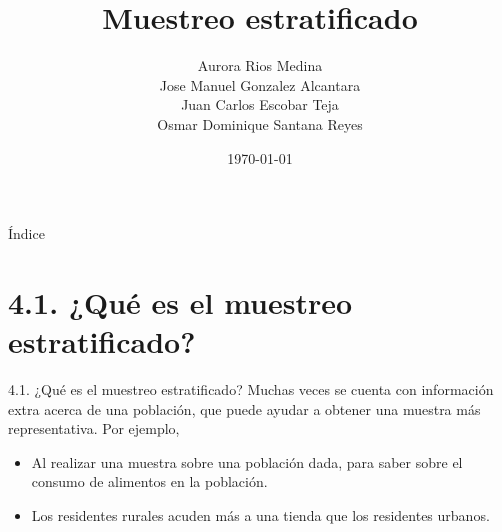 \documentclass[12pt,compress,usenames,dvipsnames,aspectratio=169]{beamer}
\title{\textbf{Muestreo estratificado}}
\author{Aurora Rios Medina \\
Jose Manuel Gonzalez Alcantara \\
Juan Carlos Escobar Teja \\
Osmar Dominique Santana Reyes}
\date{\today}
\begin{document}
\frame{\titlepage}


\begin{frame}{Índice}
	\tableofcontents
\end{frame}


\section{4.1. ¿Qué es el muestreo estratificado?}
\begin{frame}{4.1. ¿Qué es el muestreo estratificado?}
    Muchas veces se cuenta con información extra acerca de una población, que puede ayudar a obtener una muestra más representativa. Por ejemplo, \vspace{0.5mm}

    \begin{minipage}[h]{0.4\linewidth}
        \begin{itemize}
            \item Al realizar una muestra sobre una población dada, para saber sobre el consumo de alimentos en la población. 
            
        \end{itemize}
    \end{minipage} \hspace{0.05\linewidth}
    \begin{minipage}[h]{0.45\linewidth}
        \begin{itemize}
            \item Los residentes rurales acuden más a una tienda que los residentes urbanos.
            
        \end{itemize}
    \end{minipage}
\end{frame}

\end{document}

